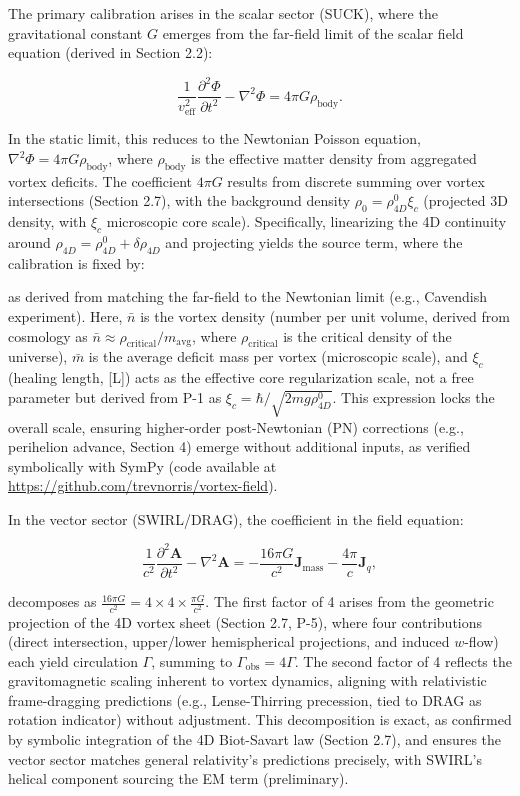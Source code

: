 The primary calibration arises in the scalar sector (SUCK), where the gravitational constant $G$ emerges from the far-field limit of the scalar field equation (derived in Section 2.2):

\[
\frac{1}{v_{\text{eff}}^2} \frac{\partial^2 \Phi}{\partial t^2} - \nabla^2 \Phi = 4\pi G \rho_{\text{body}}.
\]

In the static limit, this reduces to the Newtonian Poisson equation, $\nabla^2 \Phi = 4\pi G \rho_{\text{body}}$, where $\rho_{\text{body}}$ is the effective matter density from aggregated vortex deficits. The coefficient $4\pi G$ results from discrete summing over vortex intersections (Section 2.7), with the background density $\rho_0 = \rho_{4D}^0 \xi_c$ (projected 3D density, with $\xi_c$ microscopic core scale). Specifically, linearizing the 4D continuity around $\rho_{4D} = \rho_{4D}^0 + \delta \rho_{4D}$ and projecting yields the source term, where the calibration is fixed by:


as derived from matching the far-field to the Newtonian limit (e.g., Cavendish experiment). Here, $\bar{n}$ is the vortex density (number per unit volume, derived from cosmology as $\bar{n} \approx \rho_{\text{critical}} / m_{\text{avg}}$, where $\rho_{\text{critical}}$ is the critical density of the universe), $\bar{m}$ is the average deficit mass per vortex (microscopic scale), and $\xi_c$ (healing length, [L]) acts as the effective core regularization scale, not a free parameter but derived from P-1 as $\xi_c = \hbar / \sqrt{2 m g \rho_{4D}^0}$. This expression locks the overall scale, ensuring higher-order post-Newtonian (PN) corrections (e.g., perihelion advance, Section 4) emerge without additional inputs, as verified symbolically with SymPy (code available at \url{https://github.com/trevnorris/vortex-field}).

In the vector sector (SWIRL/DRAG), the coefficient in the field equation:

\[
\frac{1}{c^2} \frac{\partial^2 \mathbf{A}}{\partial t^2} - \nabla^2 \mathbf{A} = -\frac{16\pi G}{c^2} \mathbf{J}_{\text{mass}} - \frac{4\pi}{c} \mathbf{J}_q,
\]

decomposes as $\frac{16\pi G}{c^2} = 4 \times 4 \times \frac{\pi G}{c^2}$. The first factor of 4 arises from the geometric projection of the 4D vortex sheet (Section 2.7, P-5), where four contributions (direct intersection, upper/lower hemispherical projections, and induced $w$-flow) each yield circulation $\Gamma$, summing to $\Gamma_{\text{obs}} = 4\Gamma$. The second factor of 4 reflects the gravitomagnetic scaling inherent to vortex dynamics, aligning with relativistic frame-dragging predictions (e.g., Lense-Thirring precession, tied to DRAG as rotation indicator) without adjustment. This decomposition is exact, as confirmed by symbolic integration of the 4D Biot-Savart law (Section 2.7), and ensures the vector sector matches general relativity's predictions precisely, with SWIRL's helical component sourcing the EM term (preliminary).

